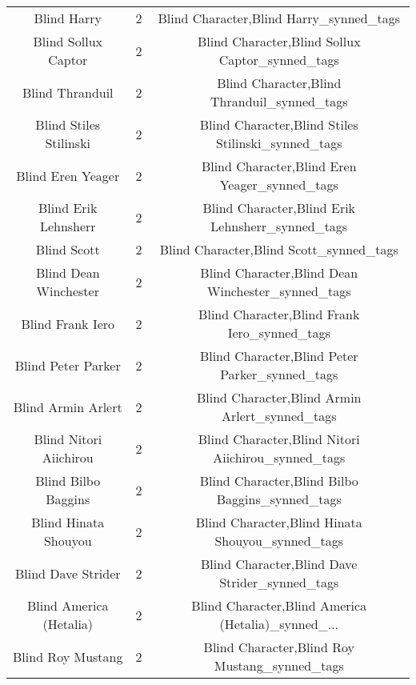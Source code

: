 \begin{table}[h!]
{\begin{tabular}{|c|c|c|}
                                       Blind Harry &          2 &            Blind Character,Blind Harry\_synned\_tags \\
                               Blind Sollux Captor &          2 &    Blind Character,Blind Sollux Captor\_synned\_tags \\
                                   Blind Thranduil &          2 &        Blind Character,Blind Thranduil\_synned\_tags \\
                            Blind Stiles Stilinski &          2 & Blind Character,Blind Stiles Stilinski\_synned\_tags \\
                                 Blind Eren Yeager &          2 &      Blind Character,Blind Eren Yeager\_synned\_tags \\
                              Blind Erik Lehnsherr &          2 &   Blind Character,Blind Erik Lehnsherr\_synned\_tags \\
                                       Blind Scott &          2 &            Blind Character,Blind Scott\_synned\_tags \\
                             Blind Dean Winchester &          2 &  Blind Character,Blind Dean Winchester\_synned\_tags \\
                                  Blind Frank Iero &          2 &       Blind Character,Blind Frank Iero\_synned\_tags \\
                                Blind Peter Parker &          2 &     Blind Character,Blind Peter Parker\_synned\_tags \\
                                Blind Armin Arlert &          2 &     Blind Character,Blind Armin Arlert\_synned\_tags \\
                            Blind Nitori Aiichirou &          2 & Blind Character,Blind Nitori Aiichirou\_synned\_tags \\
                               Blind Bilbo Baggins &          2 &    Blind Character,Blind Bilbo Baggins\_synned\_tags \\
                              Blind Hinata Shouyou &          2 &   Blind Character,Blind Hinata Shouyou\_synned\_tags \\
                                Blind Dave Strider &          2 &     Blind Character,Blind Dave Strider\_synned\_tags \\
                           Blind America (Hetalia) &          2 & Blind Character,Blind America (Hetalia)\_synned\_... \\
                                 Blind Roy Mustang &          2 &      Blind Character,Blind Roy Mustang\_synned\_tags \\

\end{tabular}}
\end{table}
